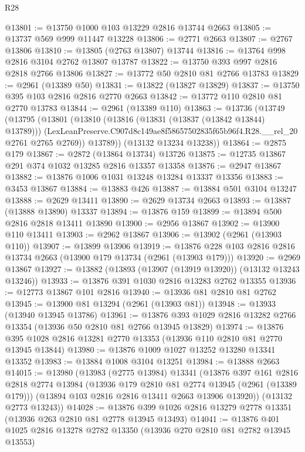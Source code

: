 \begin{lexlean}{R28}
\begin{coremodule}
@13801 := @13750 @1000 @103 @13229 @2816 @13744 @2663
@13805 := @13737 @569 @999 @11447 @13228
@13806 := @2771 @2663
@13807 := @2767 @13806
@13810 := @13805 (@2763 @13807) @13744
@13816 := @13764 @998 @2816 @3104 @2762 @13807 @13787
@13822 := @13750 @393 @997 @2816 @2818 @2766 @13806
@13827 := @13772 @50 @2810 @81 @2766 @13783
@13829 := @2961 (@13389 @50)
@13831 := @13822 (@13827 @13829)
@13837 := @13750 @395 @103 @2816 @2816 @2770 @2663
@13842 := @13772 @110 @2810 @81 @2770 @13783
@13844 := @2961 (@13389 @110)
@13863 := @13736
    (@13749
      (@13795
        (@13801
          (@13810
            (@13816 (@13831 (@13837 (@13842 @13844) @13789)))
            (LexLeanPreserve.C907d8c149ae8f58657502835f65b96f4.R28.__rel_20 @2761 @2765 @2769))
          @13789))
      (@13132 @13234 @13238))
@13864 := @2875 @179
@13867 := @2872 (@13864 @13734) @13726
@13875 := @12735 @13867 @291 @374 @1032 @13285 @2816 @13357 @13358
@13876 := @2947 @13867
@13882 := @13876 @1006 @1031 @13248 @13284 @13337 @13356
@13883 := @3453 @13867
@13884 := @13883 @426
@13887 := @13884 @501 @3104 @13247
@13888 := @2629 @13411
@13890 := @2629 @13734 @2663
@13893 := @13887 (@13888 @13890) @13337
@13894 := @13876 @159
@13899 := @13894 @500 @2816 @2818 @13411 @13890
@13900 := @2956 @13867
@13902 := @13900 @110 @13411
@13903 := @2962 @13867
@13906 := @13902 (@2961 (@13903 @110))
@13907 := @13899 @13906
@13919 := @13876 @228 @103 @2816 @2816 @13734 @2663 (@13900 @179 @13734 (@2961 (@13903 @179)))
@13920 := @2969 @13867
@13927 := @13882 (@13893 (@13907 (@13919 @13920)) (@13132 @13243 @13246))
@13933 := @13876 @391 @1030 @2816 @13283 @2762 @13355
@13936 := @12773 @13867 @101 @2816
@13940 := @13936 @81 @2810 @81 @2762
@13945 := @13900 @81 @13294 (@2961 (@13903 @81))
@13948 := @13933 (@13940 @13945 @13786)
@13961 := @13876 @393 @1029 @2816 @13282 @2766 @13354 (@13936 @50 @2810 @81 @2766 @13945 @13829)
@13974 := @13876 @395 @1028 @2816 @13281 @2770 @13353 (@13936 @110 @2810 @81 @2770 @13945 @13844)
@13980 := @13876 @1009 @1027 @13252 @13280 @13341 @13352
@13983 := @13884 @1008 @3104 @13251
@13984 := @13888 @2663
@14015 := @13980
    (@13983
      (@2775 @13984)
      @13341
      (@13876
        @397
        @161
        @2816
        @2818
        @2774
        @13984
        (@13936 @179 @2810 @81 @2774 @13945 (@2961 (@13389 @179)))
        (@13894 @103 @2816 @2816 @13411 @2663 @13906 @13920))
      (@13132 @2773 @13243))
@14028 := @13876 @399 @1026 @2816 @13279 @2778 @13351 (@13936 @263 @2810 @81 @2778 @13945 @13493)
@14041 := @13876 @401 @1025 @2816 @13278 @2782 @13350 (@13936 @270 @2810 @81 @2782 @13945 @13553)

\end{coremodule}
\end{lexlean}
